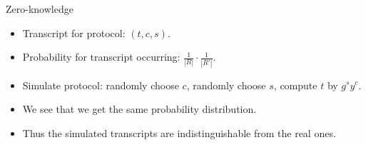\begin{frame}
  \begin{block}{Zero-knowledge}
    \begin{itemize}
      \item Transcript for protocol: \((t, c, s)\).

      \item Probability for transcript occurring: \(\frac{1}{|R|}\cdot 
          \frac{1}{|R'|}\).

        \pause{}

      \item Simulate protocol: randomly choose \(c\), randomly choose \(s\), 
        compute \(t\) by \(g^s y^c\).

        \pause{}

      \item We see that we get the same probability distribution.
      \item Thus the simulated transcripts are indistinguishable from the real 
        ones.
    \end{itemize}
  \end{block}
\end{frame}


